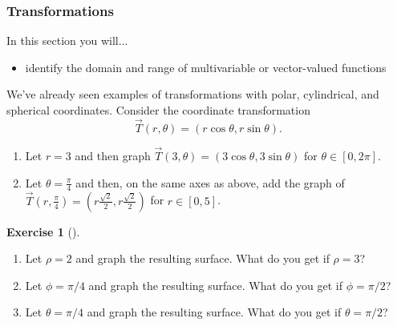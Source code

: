 \documentclass[10pt,]{book}
\theoremstyle{plain}
\theoremstyle{definition}
\theoremstyle{definition}
\theoremstyle{definition}
\theoremstyle{definition}
\newtheorem{exploration}[project]{Exercise}
\theoremstyle{definition}
\numberwithin{equation}{section}
\begin{document}
\subsubsection[{Transformations}]{Transformations}\label{subsubsection-1}
In this section you will... \leavevmode%
\begin{itemize}[label=\textbullet]
\item{}identify the domain and range of multivariable or vector-valued functions%
\end{itemize}
%
\par
We've already seen examples of transformations with polar, cylindrical, and spherical coordinates.%
Consider the coordinate transformation%
\begin{equation*}
\vec T(r,\theta) = (r\cos\theta,r\sin\theta).
\end{equation*}
\leavevmode%
\begin{enumerate}
\item\hypertarget{li-65}{}Let \(r=3\) and then graph \(\vec T(3,\theta)=(3\cos\theta,3\sin\theta)\) for \(\theta\in[0,2\pi]\).%
\item\hypertarget{li-66}{}Let \(\theta=\frac{\pi}{4}\) and then, on the same axes as above, add the graph of \(\vec T\left(r,\frac{\pi}{4}\right)=\left(r\frac{\sqrt 2}{2},r \frac{\sqrt 2}{2}\right)\) for \(r\in[0,5]\).%
\end{enumerate}
%
\begin{exploration}[]\label{graphing_spherical_coordinates}
\leavevmode%
\begin{enumerate}[font=\bfseries,label=(\alph*),ref=\alph*]
\item\label{task-237} Let \(\rho=2\) and graph the resulting surface.  What do you get if \(\rho = 3\)?%
\item\label{task-238} Let \(\phi=\pi/4\) and graph the resulting surface.  What do you get if \(\phi=\pi/2\)?%
\item\label{task-239} Let \(\theta=\pi/4\) and graph the resulting surface.  What do you get if \(\theta=\pi/2\)?%
\end{enumerate}
\end{exploration}
\typeout{************************************************}
\typeout{************************************************}
\end{document}
